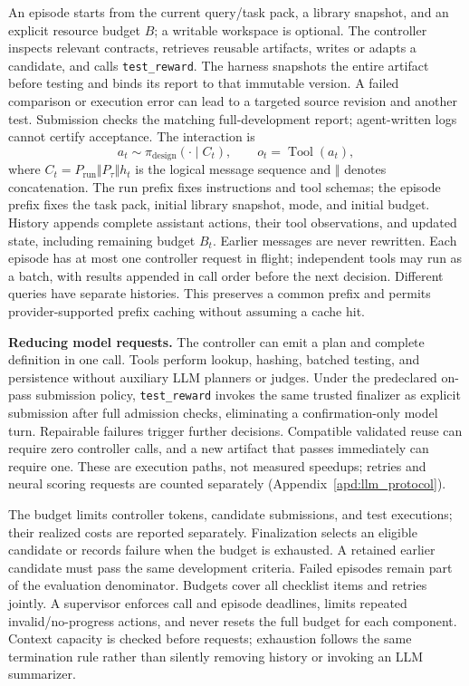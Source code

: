 An episode starts from the current query/task pack, a library snapshot, and an explicit resource budget $B$; a writable workspace is optional. The controller inspects relevant contracts, retrieves reusable artifacts, writes or adapts a candidate, and calls \texttt{test\_reward}. The harness snapshots the entire artifact before testing and binds its report to that immutable version. A failed comparison or execution error can lead to a targeted source revision and another test. Submission checks the matching full-development report; agent-written logs cannot certify acceptance. The interaction is
\begin{equation}
    a_t\sim\pi_{\mathrm{design}}(\cdot\mid C_t),
    \qquad o_t=\operatorname{Tool}(a_t),
\end{equation}
where $C_t=P_{\mathrm{run}}\Vert P_\tau\Vert h_t$ is the logical message sequence and $\Vert$ denotes concatenation. The run prefix fixes instructions and tool schemas; the episode prefix fixes the task pack, initial library snapshot, mode, and initial budget. History appends complete assistant actions, their tool observations, and updated state, including remaining budget $B_t$. Earlier messages are never rewritten. Each episode has at most one controller request in flight; independent tools may run as a batch, with results appended in call order before the next decision. Different queries have separate histories. This preserves a common prefix and permits provider-supported prefix caching without assuming a cache hit.

\noindent\textbf{Reducing model requests.} The controller can emit a plan and complete definition in one call. Tools perform lookup, hashing, batched testing, and persistence without auxiliary LLM planners or judges. Under the predeclared on-pass submission policy, \texttt{test\_reward} invokes the same trusted finalizer as explicit submission after full admission checks, eliminating a confirmation-only model turn. Repairable failures trigger further decisions. Compatible validated reuse can require zero controller calls, and a new artifact that passes immediately can require one. These are execution paths, not measured speedups; retries and neural scoring requests are counted separately (Appendix~\ref{apd:llm_protocol}).

The budget limits controller tokens, candidate submissions, and test executions; their realized costs are reported separately. Finalization selects an eligible candidate or records failure when the budget is exhausted. A retained earlier candidate must pass the same development criteria. Failed episodes remain part of the evaluation denominator. Budgets cover all checklist items and retries jointly. A supervisor enforces call and episode deadlines, limits repeated invalid/no-progress actions, and never resets the full budget for each component. Context capacity is checked before requests; exhaustion follows the same termination rule rather than silently removing history or invoking an LLM summarizer.

